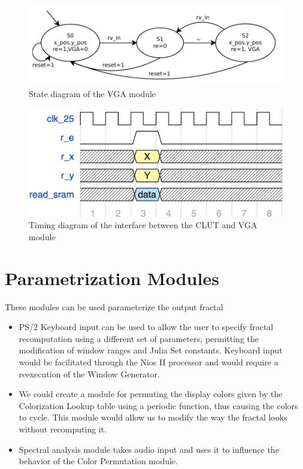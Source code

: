 \documentclass{article}
\begin{document}
\begin{figure}[h!]
  \centering
    \includegraphics[width=\textwidth]{state_diagrams/vga.pdf}
  \caption{State diagram of the VGA module}
\end{figure}

\begin{figure}[h!]
  \centering
    \includegraphics[width=\textwidth]{timing_diagrams/clut_vga.pdf}
  \caption{Timing diagram of the interface between the CLUT and VGA module}
\end{figure}



\section{Parametrization Modules}

These modules can be used parameterize the output fractal

\begin{itemize}
\item PS/2 Keyboard input can be used to allow the user to specify
  fractal recomputation using a different set of parameters,
  permitting the modification of window ranges and Julia Set
  constants. Keyboard input would be facilitated through the Nios II
  processor and would require a reexecution of the Window Generator.
\item We could create a module for permuting the display colors given
  by the Colorization Lookup table using a periodic function, thus
  causing the colors to cycle. This module would allow us to modify
  the way the fractal looks without recomputing it.
\item Spectral analysis module takes audio input and uses it to
  influence the behavior of the Color Permutation module.
\end{itemize}
\end{document}
